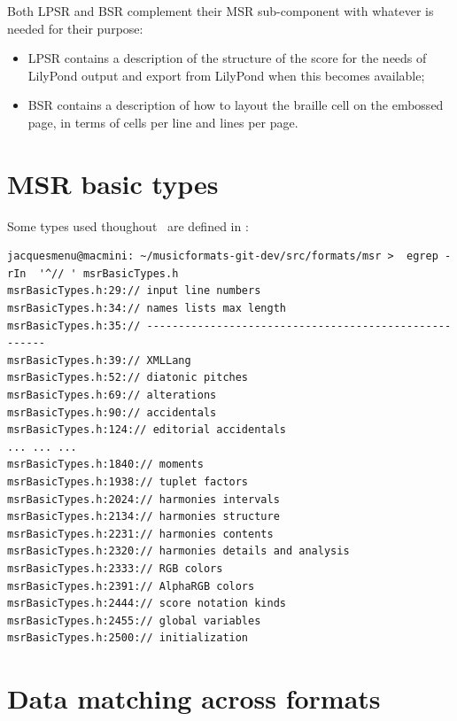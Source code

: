Both LPSR and BSR complement their MSR sub-component with whatever is needed for their purpose:
\begin{itemize}
\item LPSR contains a description of the structure of the score for the needs of LilyPond output and export from LilyPond when this becomes available;  %
\item BSR contains a description of how to layout the braille cell on the embossed page, in terms of cells per line and lines per page.
\end{itemize}


\section{MSR basic types}\label{MSR basic types}

Some types used thoughout \msrRepr\ are defined in :%
\begin{lstlisting}[language=Terminal]
jacquesmenu@macmini: ~/musicformats-git-dev/src/formats/msr >  egrep -rIn  '^// ' msrBasicTypes.h
msrBasicTypes.h:29:// input line numbers
msrBasicTypes.h:34:// names lists max length
msrBasicTypes.h:35:// ------------------------------------------------------
msrBasicTypes.h:39:// XMLLang
msrBasicTypes.h:52:// diatonic pitches
msrBasicTypes.h:69:// alterations
msrBasicTypes.h:90:// accidentals
msrBasicTypes.h:124:// editorial accidentals
... ... ...
msrBasicTypes.h:1840:// moments
msrBasicTypes.h:1938:// tuplet factors
msrBasicTypes.h:2024:// harmonies intervals
msrBasicTypes.h:2134:// harmonies structure
msrBasicTypes.h:2231:// harmonies contents
msrBasicTypes.h:2320:// harmonies details and analysis
msrBasicTypes.h:2333:// RGB colors
msrBasicTypes.h:2391:// AlphaRGB colors
msrBasicTypes.h:2444:// score notation kinds
msrBasicTypes.h:2455:// global variables
msrBasicTypes.h:2500:// initialization
\end{lstlisting}


\section{Data matching across formats}\label{Data matching across formats}

